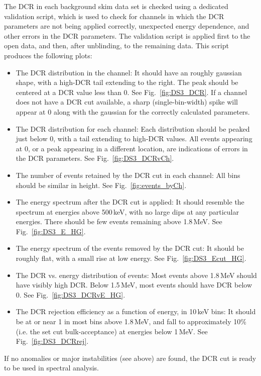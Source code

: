 The DCR in each background skim data set is checked using a dedicated validation script, which is used to check for channels in which the DCR parameters are not being applied correctly, unexpected energy dependence, and other errors in the DCR parameters.  The validation script is applied first to the open data, and then, after unblinding, to the remaining data. This script produces the following plots:
\begin{itemize}
\item The DCR distribution in the channel: It should have an roughly gaussian shape, with a high-DCR tail extending to the right. The peak should be centered at a DCR value less than 0. See Fig.~\ref{fig:DS3_DCR}. If a channel does not have a DCR cut available, a sharp (single-bin-width) spike will appear at 0 along with the gaussian for the correctly calculated parameters. 
\item The DCR distribution for each channel: Each distribution should be peaked just below 0, with a tail extending to high-DCR values. All events appearing at 0, or a peak appearing in a different location, are indications of errors in the DCR parameters. See Fig.~\ref{fig:DS3_DCRvCh}.
\item The number of events retained by the DCR cut in each channel: All bins should be similar in height. See Fig.~\ref{fig:events_byCh}.
\item The energy spectrum after the DCR cut is applied: It should resemble the \twonubb spectrum at energies above 500\,keV, with no large dips at any particular energies. There should be few events remaining above 1.8\,MeV. See Fig.~\ref{fig:DS3_E_HG}.
\item The energy spectrum of the events removed by the DCR cut: It should be roughly flat, with a small rise at low energy. See Fig.~\ref{fig:DS3_Ecut_HG}.
\item The DCR vs. energy distribution of events: Most events above 1.8\,MeV should have visibly high DCR. Below 1.5\,MeV, most events should have DCR below 0. See Fig.~\ref{fig:DS3_DCRvE_HG}.
\item The DCR rejection efficiency as a function of energy, in 10\,keV bins: It should be at or near 1 in most bins above 1.8\,MeV, and fall to approximately 10\% (i.e. the set cut bulk-acceptance) at energies below 1\,MeV. See Fig.~\ref{fig:DS3_DCRrej}.
\end{itemize}

If no anomalies or major instabilities (see above) are found, the DCR cut is ready to be used in spectral analysis. 

